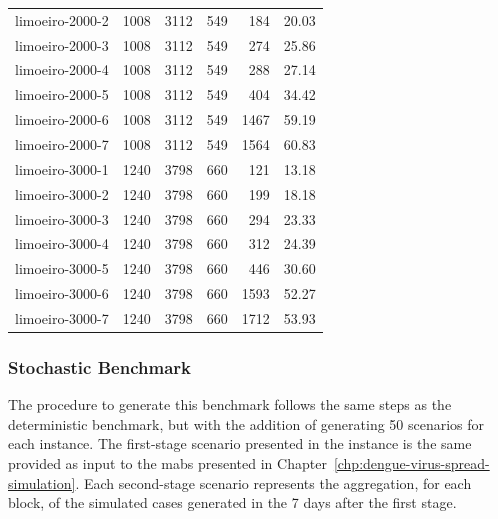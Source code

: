 \begin{table}[h!]
\begin{tabular}{lrrrrr}
		limoeiro-2000-2                                                                      & 1008 & 3112 & 549 & 184  & 20.03 \\
		limoeiro-2000-3                                                                      & 1008 & 3112 & 549 & 274  & 25.86 \\
		limoeiro-2000-4                                                                      & 1008 & 3112 & 549 & 288  & 27.14 \\
		limoeiro-2000-5                                                                      & 1008 & 3112 & 549 & 404  & 34.42 \\
		limoeiro-2000-6                                                                      & 1008 & 3112 & 549 & 1467 & 59.19 \\
		limoeiro-2000-7                                                                      & 1008 & 3112 & 549 & 1564 & 60.83 \\ 
		limoeiro-3000-1                                                                      & 1240 & 3798 & 660 & 121  & 13.18 \\
		limoeiro-3000-2                                                                      & 1240 & 3798 & 660 & 199  & 18.18 \\
		limoeiro-3000-3                                                                      & 1240 & 3798 & 660 & 294  & 23.33 \\
		limoeiro-3000-4                                                                      & 1240 & 3798 & 660 & 312  & 24.39 \\
		limoeiro-3000-5                                                                      & 1240 & 3798 & 660 & 446  & 30.60 \\
		limoeiro-3000-6                                                                      & 1240 & 3798 & 660 & 1593 & 52.27 \\
		limoeiro-3000-7                                                                      & 1240 & 3798 & 660 & 1712 & 53.93 \\ \hline
	\end{tabular}%
\end{table}

\subsubsection{Stochastic Benchmark}

The procedure to generate this benchmark follows the same steps as the deterministic benchmark, but with the addition of generating 50 scenarios for each instance. The first-stage scenario presented in the instance is the same provided as input to the \gls{mabs} presented in Chapter~\ref{chp:dengue-virus-spread-simulation}. Each second-stage scenario represents the aggregation, for each block, of the simulated cases generated in the 7 days after the first stage.

